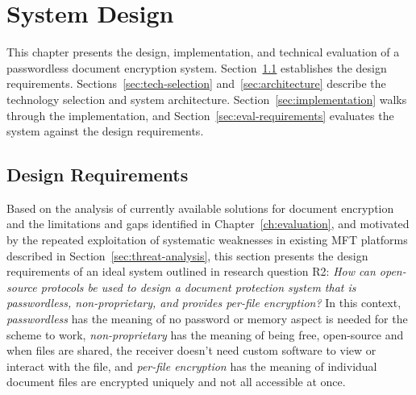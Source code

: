 \chapter{System Design}
\label{ch:system-design}

This chapter presents the design, implementation, and technical evaluation of a passwordless document encryption system. Section~\ref{sec:design-requirements} establishes the design requirements. Sections~\ref{sec:tech-selection} and~\ref{sec:architecture} describe the technology selection and system architecture. Section~\ref{sec:implementation} walks through the implementation, and Section~\ref{sec:eval-requirements} evaluates the system against the design requirements.

\section{Design Requirements}
\label{sec:design-requirements}

Based on the analysis of currently available solutions for document encryption and the limitations and gaps identified in Chapter~\ref{ch:evaluation}, and motivated by the repeated exploitation of systematic weaknesses in existing MFT platforms described in Section~\ref{sec:threat-analysis}, this section presents the design requirements of an ideal system outlined in research question R2: \emph{How can open-source protocols be used to design a document protection system that is passwordless, non-proprietary, and provides per-file encryption?} In this context, \emph{passwordless} has the meaning of no password or memory aspect is needed for the scheme to work, \emph{non-proprietary} has the meaning of being free, open-source and when files are shared, the receiver doesn't need custom software to view or interact with the file, and \emph{per-file encryption} has the meaning of individual document files are encrypted uniquely and not all accessible at once.

